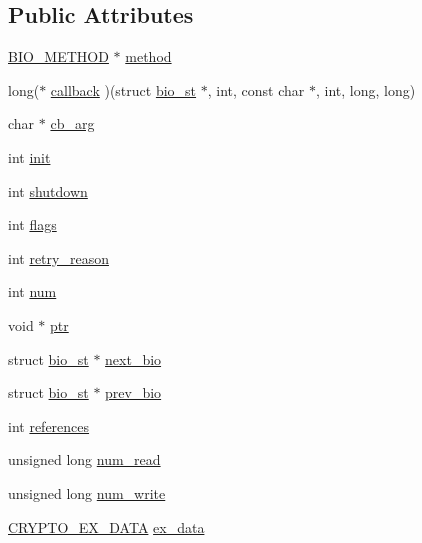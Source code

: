 \subsection*{Public Attributes}
\begin{DoxyCompactItemize}
\item 
\hyperlink{bio_8h_a2b58cec65ab7bb9eda7c86d707e687ca}{B\+I\+O\+\_\+\+M\+E\+T\+H\+OD} $\ast$ \hyperlink{structbio__st_ac4bef031359b51902ddfb2a7aeaa4dd7}{method}
\item 
long($\ast$ \hyperlink{structbio__st_a6449aab690198cbecb3bc45d9cbf59ac}{callback} )(struct \hyperlink{structbio__st}{bio\+\_\+st} $\ast$, int, const char $\ast$, int, long, long)
\item 
char $\ast$ \hyperlink{structbio__st_a50cdd0a5e46c7253bc6ab1cb37abeaca}{cb\+\_\+arg}
\item 
int \hyperlink{structbio__st_a365cca316f1daf354096eec7dbf98102}{init}
\item 
int \hyperlink{structbio__st_adafdb3d0f58c31b776525ddceec5068b}{shutdown}
\item 
int \hyperlink{structbio__st_aa815fc844603d4a3fcf7abebfeb3f546}{flags}
\item 
int \hyperlink{structbio__st_a4c3a2c24d7c41e8887762750b213e9f0}{retry\+\_\+reason}
\item 
int \hyperlink{structbio__st_a3b769c998195a0f139bc68e1a36aaf09}{num}
\item 
void $\ast$ \hyperlink{structbio__st_ad59e7884d7949dd931c76ac0d84c2ea5}{ptr}
\item 
struct \hyperlink{structbio__st}{bio\+\_\+st} $\ast$ \hyperlink{structbio__st_adf41b29002a5236e8112253dd9d8acbf}{next\+\_\+bio}
\item 
struct \hyperlink{structbio__st}{bio\+\_\+st} $\ast$ \hyperlink{structbio__st_a86fd505e8e4af7bb98312d707ee9d170}{prev\+\_\+bio}
\item 
int \hyperlink{structbio__st_a6b72d783529f2185bb1c452ab6845d5e}{references}
\item 
unsigned long \hyperlink{structbio__st_ab70dbdf7e557e771f49b12df73e6a91e}{num\+\_\+read}
\item 
unsigned long \hyperlink{structbio__st_a3b884313deeabd3eb35e693394937a0e}{num\+\_\+write}
\item 
\hyperlink{ossl__typ_8h_a7eaff1c18057495d8af18f22d1370b51}{C\+R\+Y\+P\+T\+O\+\_\+\+E\+X\+\_\+\+D\+A\+TA} \hyperlink{structbio__st_a499ee1071ec22ec4da6086422785a0ca}{ex\+\_\+data}
\end{DoxyCompactItemize}


